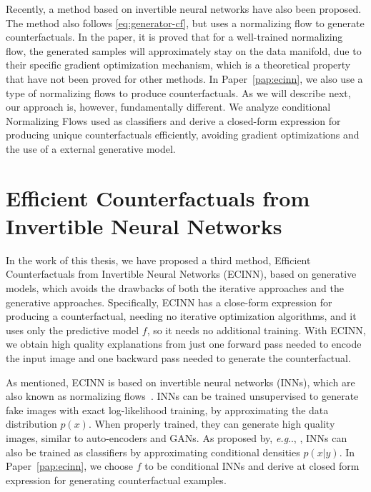 \documentclass[11pt,a4paper,twoside,openright,final]{memoir}
\makeatletter
\DeclareRobustCommand\onedot{\futurelet\@let@token\@onedot}
\def\@onedot{\ifx\@let@token.\else.\null\fi\xspace}
\def\eg{\emph{e.g}\onedot} \def\Eg{\emph{E.g}\onedot}
\newcommand\contribution[1]{\hspace{0.5em}\hyperref[#1]{\ding{81}}}
\newcommand*{\paperref}[1]{Paper~\hyperref[#1]{\ref{#1}}}
\makeatother
\begin{document}
Recently, a method based on invertible neural networks have also been proposed.
The method also follows \eqref{eq:generator-cf}, but uses a normalizing flow to generate counterfactuals. 
In the paper, it is proved that for a well-trained normalizing flow,  the generated samples will approximately stay on the data manifold, due to their specific gradient optimization mechanism, which is a theoretical property that have not been proved for other methods.
In \paperref{pap:ecinn}, we also use a type of normalizing flows to produce counterfactuals. 
As we will describe next, our approach is, however, fundamentally different. 
We analyze conditional Normalizing Flows used as classifiers and derive a closed-form expression for producing unique counterfactuals efficiently, avoiding gradient optimizations and the use of a external generative model.

\section{Efficient Counterfactuals from Invertible Neural Networks\contribution{pap:ecinn}}\label{sec:ecinn}
In the work of this thesis, we have proposed a third method, Efficient Counterfactuals from Invertible Neural Networks (ECINN), based on generative models, which avoids the drawbacks of both the iterative approaches and the generative approaches.
Specifically, ECINN has a close-form expression for producing a counterfactual, needing no iterative optimization algorithms, and it uses only the predictive model $f$, so it needs no additional training. 
With ECINN, we obtain high quality explanations from just one forward pass needed to encode the input image and one backward pass needed to generate the counterfactual. 

As mentioned, ECINN is based on invertible neural networks (INNs), which are also known as normalizing flows~\cite{realnvp, nice, glow}.
INNs can be trained unsupervised to generate fake images with exact log-likelihood training, by approximating the data distribution $p(x)$.
When properly trained, they can generate high quality images, similar to auto-encoders and GANs.
As proposed by, \eg, \citet{ibinn}, INNs can also be trained as classifiers by approximating conditional densities $p(x | y)$.  
In \paperref{pap:ecinn}, we choose $f$ to be conditional INNs and derive at closed form expression for generating counterfactual examples. 
\end{document}
